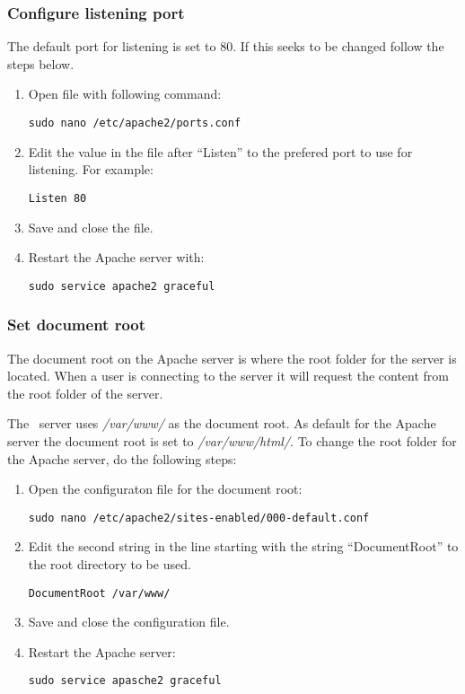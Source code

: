 \subsubsection{Configure listening port}\label{sec:exp_d_ports}
The default port for listening is set to 80. If this seeks to be changed follow the steps below.
\begin{enumerate}
	\item Open file with following command: \begin{verbatim}sudo nano /etc/apache2/ports.conf\end{verbatim}
    \item Edit the value in the file after ``Listen'' to the prefered port to use for listening. 
    For example: \begin{verbatim}Listen 80\end{verbatim}
    \item Save and close the file.
    \item Restart the Apache server with: \begin{verbatim}sudo service apache2 graceful\end{verbatim}
\end{enumerate}

\subsubsection{Set document root}\label{sec:exp_d_docroot}
The document root on the Apache server is where the root folder for the server is located. When a user is connecting to the server it will request the content from the root folder of the server.

The \appName\ server uses \textit{/var/www/} as the document root. As default for the Apache server 
the document root is set to \textit{/var/www/html/}.
To change the root folder for the Apache server, do the following steps:
\begin{enumerate}
	\item Open the configuraton file for the document root: \begin{verbatim}sudo nano /etc/apache2/sites-enabled/000-default.conf\end{verbatim}
    \item Edit the second string in the line starting with the string ``DocumentRoot'' to the root directory to be used.
    \begin{verbatim}DocumentRoot /var/www/\end{verbatim}
    \item Save and close the configuration file.
    \item Restart the Apache server: \begin{verbatim}sudo service apasche2 graceful\end{verbatim}
\end{enumerate}

